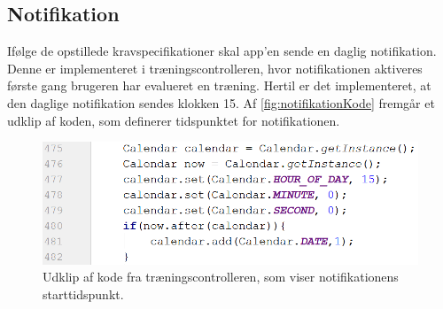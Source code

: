 \subsection{Notifikation}
Ifølge de opstillede kravspecifikationer skal app'en sende en daglig notifikation. Denne er implementeret i træningscontrolleren, hvor notifikationen aktiveres første gang brugeren har evalueret en træning. Hertil er det implementeret, at den daglige notifikation sendes klokken 15. Af \autoref{fig:notifikationKode} fremgår et udklip af koden, som definerer tidspunktet for notifikationen. 

\begin{figure} [H]
\centering
\includegraphics[width=1\textwidth]{figures/imple/notifikationKode}
\caption{Udklip af kode fra træningscontrolleren, som viser notifikationens starttidspunkt.}
\label{fig:notifikationKode}
\end{figure} 







